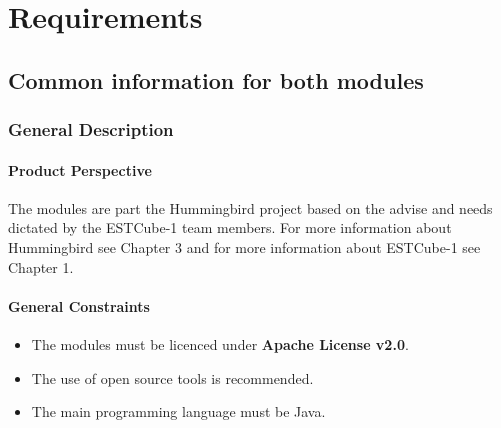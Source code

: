 
\lstset{breaklines=true, breakatwhitespace=true}
\lstset{numbers=left, numberstyle=\scriptsize}
 


\chapter{Requirements}

\section{Common information for both modules}

\subsection{General Description}
\subsubsection{Product Perspective}
The modules are part the Hummingbird project based on the advise and needs dictated by the ESTCube-1 team members. For more information about Hummingbird see Chapter 3 and for more information about ESTCube-1 see Chapter 1. 

\subsubsection{General Constraints}

\begin{itemize}
\item The modules must be licenced under \textbf{Apache License v2.0}\cite{AL20}.
\item The use of open source tools is recommended.
\item The main programming language must be Java\cite{Java}.
\end{itemize}


